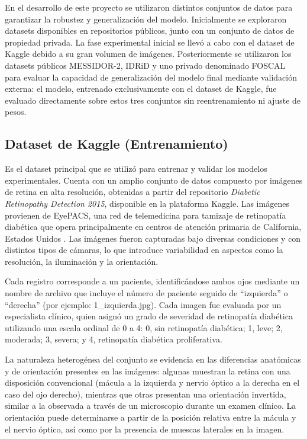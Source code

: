 En el desarrollo de este proyecto se utilizaron distintos conjuntos de datos para 
garantizar la robustez y generalización del modelo. Inicialmente se exploraron datasets 
disponibles en repositorios públicos, junto con un conjunto de datos de propiedad 
privada. La fase experimental inicial se llevó a cabo con el dataset de Kaggle debido a 
su gran volumen de imágenes. Posteriormente se utilizaron los datasets públicos
MESSIDOR-2, IDRiD y uno privado denominado FOSCAL para evaluar la capacidad de
generalización del modelo final mediante validación externa: el modelo, entrenado
exclusivamente con el dataset de Kaggle, fue evaluado directamente sobre estos tres
conjuntos sin reentrenamiento ni ajuste de pesos.

\subsection{Dataset de Kaggle (Entrenamiento)}

Es el dataset principal que se utilizó para entrenar y validar los modelos
experimentales. Cuenta con un amplio conjunto de datos compuesto por imágenes de retina
en alta resolución, obtenidas a partir del repositorio \textit{Diabetic Retinopathy
Detection 2015}, disponible en la plataforma Kaggle. Las imágenes provienen de EyePACS,
una red de telemedicina para tamizaje de retinopatía diabética que opera principalmente
en centros de atención primaria de California, Estados Unidos
. Las imágenes fueron capturadas bajo
diversas condiciones y con distintos tipos de cámaras, lo que introduce variabilidad en
aspectos como la resolución, la iluminación y la orientación.

Cada registro corresponde a un paciente, identificándose ambos ojos mediante un nombre de 
archivo que incluye el número de paciente seguido de \enquote{izquierda} o
\enquote{derecha} (por 
ejemplo: 1\_izquierda.jpg). Cada imagen fue evaluada por un especialista
clínico, quien asignó un grado de severidad de retinopatía diabética utilizando una
escala ordinal de 0 a 4: 0, sin retinopatía diabética; 1, leve; 2, moderada; 3, severa;
y 4, retinopatía diabética proliferativa.

La naturaleza heterogénea del conjunto se evidencia en las diferencias anatómicas y de 
orientación presentes en las imágenes: algunas muestran la retina con una disposición 
convencional (mácula a la izquierda y nervio óptico a la derecha en el caso del ojo 
derecho), mientras que otras presentan una orientación invertida, similar a la observada 
a través de un microscopio durante un examen clínico. La orientación puede determinarse a 
partir de la posición relativa entre la mácula y el nervio óptico, así como por la 
presencia de muescas laterales en la imagen.


